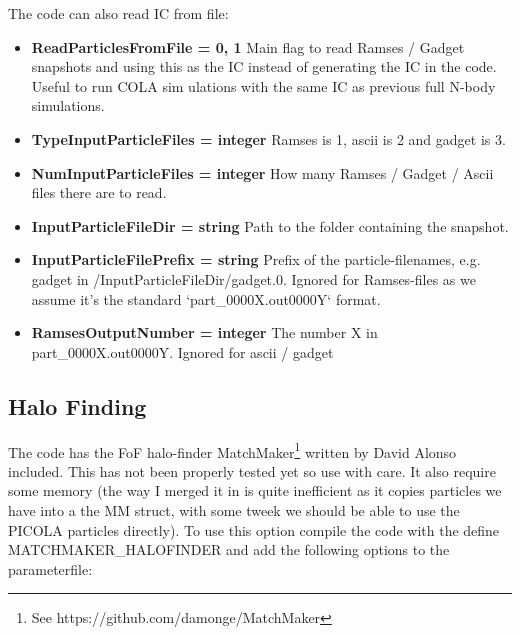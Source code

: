 \documentclass[usenatbib]{article}
\begin{document}
The code can also read IC from file:

\begin{itemize}

\item \textbf{ReadParticlesFromFile = 0, 1} Main flag to read Ramses / Gadget snapshots and using this as the IC instead of generating the IC in the code. Useful to run COLA sim
ulations with the same IC as previous full N-body simulations.

\item \textbf{TypeInputParticleFiles = integer}  Ramses is 1, ascii is 2 and gadget is 3.

\item \textbf{NumInputParticleFiles = integer} How many Ramses / Gadget / Ascii files there are to read.

\item \textbf{InputParticleFileDir = string} Path to the folder containing the snapshot.

\item \textbf{InputParticleFilePrefix = string} Prefix of the particle-filenames, e.g. gadget in /InputParticleFileDir/gadget.0. Ignored for Ramses-files as we assume it's the standard `part\_0000X.out0000Y` format.

\item \textbf{RamsesOutputNumber = integer} The number X in part\_0000X.out0000Y. Ignored for ascii / gadget

\end{itemize}

\subsection*{Halo Finding}

The code has the FoF halo-finder MatchMaker\footnote{See https://github.com/damonge/MatchMaker} written by David Alonso included. This has not been properly tested yet so use with care. It also require some memory (the way I merged it in is quite inefficient as it copies particles we have into a the MM struct, with some tweek we should be able to use the PICOLA particles directly). To use this option compile the code with the define MATCHMAKER\_HALOFINDER and add the following options to the parameterfile:
\end{document}
